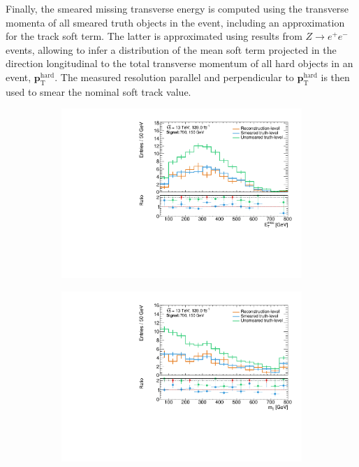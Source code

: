 Finally, the smeared missing transverse energy is computed using the transverse momenta of all smeared truth objects in the event, including an approximation for the track soft term. The latter is approximated using results from $Z\rightarrow e^+e^-$ events, allowing to infer a distribution of the mean soft term projected in the direction longitudinal to the total transverse momentum of all hard objects in an event, $\boldsymbol{p}_\mathrm{T}^\mathrm{hard}$. The measured resolution parallel and perpendicular to $\boldsymbol{p}_\mathrm{T}^\mathrm{hard}$ is then used to smear the nominal soft track value.
 
  \begin{figure}
	\centering
	\begin{subfigure}[b]{0.45\linewidth}
		\centering\includegraphics[width=\textwidth]{20210324/700_150/met_C1N2_Wh_hbb_700p0_150p0_smeared.pdf}
	\end{subfigure}\hfill
	\begin{subfigure}[b]{0.45\linewidth}
		\centering\includegraphics[width=\textwidth]{20210324/700_150/mt_C1N2_Wh_hbb_700p0_150p0_smeared.pdf}

\end{subfigure}
\end{figure}
